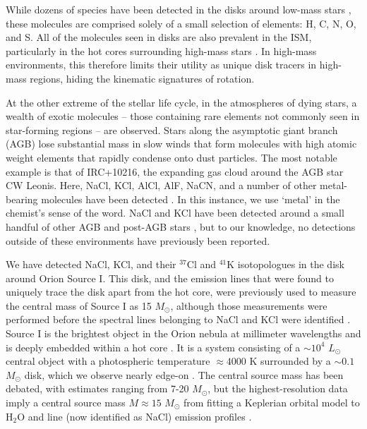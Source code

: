 \documentclass[12pt]{article}
\newcommand{\msun}{\ensuremath{M_{\odot}}\xspace}			%
\newcommand{\lsun}{\ensuremath{L_{\odot}}\xspace}			%
\newcommand{\water}{H$_{2}$O\xspace}		%
\begin{document}

While dozens of species have been detected in the disks around low-mass stars \cite{McGuire2018c}, these molecules are comprised solely of a small selection of elements: H, C, N, O, and S.  All of the molecules seen in disks are also prevalent in the ISM, particularly in the hot cores surrounding high-mass stars \cite{some sgr b2 reference}. In high-mass environments, this therefore limits their utility as unique disk tracers in high-mass regions, hiding the kinematic signatures of rotation.

At the other extreme of the stellar life cycle, in the atmospheres of dying stars, a wealth of exotic molecules -- those containing rare elements not commonly seen in star-forming regions -- are observed.  Stars along the asymptotic giant branch (AGB) lose substantial mass in slow winds \cite{Herwig2005a} that form molecules with high atomic weight elements that rapidly condense onto dust particles.  The most notable example is that of IRC+10216, the expanding gas cloud around the AGB star CW Leonis.  Here, NaCl, KCl, AlCl, AlF, NaCN, and a number of other metal-bearing molecules have been detected \cite{Agundez2012a,Zack2011a}.  In this instance, we use `metal' in the chemist's sense of the word.  NaCl and KCl have been detected around a small handful of other AGB and post-AGB stars \cite{Milam2007a,Highberger2003a,Sanchez-Contreras2018a}, but to our knowledge, no detections outside of these environments have previously been reported.

We have detected NaCl, KCl, and their $^{37}$Cl and $^{41}$K isotopologues in the disk around Orion Source I.  This disk, and the emission lines that were found to uniquely trace the disk apart from the hot core, were previously used to measure the central mass of Source I as 15 \msun, although those measurements were performed before the spectral lines belonging to NaCl and KCl were identified \cite{Ginsburg2018b}.  Source I is the brightest object in the Orion nebula at millimeter wavelengths and is deeply embedded within a hot core \cite{}.  It is a system consisting of a $\sim10^4$ \lsun central object with a photospheric temperature $\approx4000$ K \cite{Testi2010a} surrounded by a $\sim0.1$ \msun disk, which we observe nearly edge-on \cite{Plambeck2016a}. The central source mass has been debated, with estimates ranging from 7-20 \msun \cite{Matthews2010a,other}, but the highest-resolution data imply a central source mass $M\approx15$ \msun from fitting a Keplerian orbital model to \water and line (now identified as NaCl) emission profiles \cite{Ginsburg2018b}.
\end{document}
